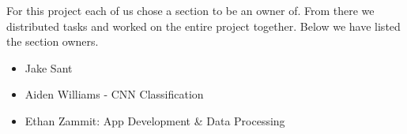 For this project each of us chose a section to be an owner of.
From there we distributed tasks and worked on the entire project together.
Below we have listed the section owners.

\begin{itemize}

    \item Jake Sant

    \item Aiden Williams - CNN Classification

    \item Ethan Zammit: App Development \& Data Processing

\end{itemize}